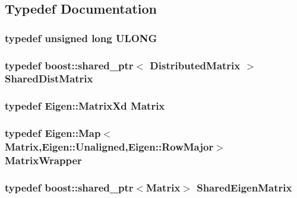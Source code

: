 \subsection{Typedef Documentation}
\hypertarget{namespaceJKBuilder_af632da489ebc3708ec3ab6791ee53fa4}{
\subsubsection[{ULONG}]{\setlength{\rightskip}{0pt plus 5cm}typedef unsigned long {\bf ULONG}}}
\label{namespaceJKBuilder_af632da489ebc3708ec3ab6791ee53fa4}
\hypertarget{namespaceJKBuilder_a3b337e72f5cb0686ec93e063dda09c70}{
\subsubsection[{SharedDistMatrix}]{\setlength{\rightskip}{0pt plus 5cm}typedef boost::shared\_\-ptr$<$ {\bf DistributedMatrix} $>$ {\bf SharedDistMatrix}}}
\label{namespaceJKBuilder_a3b337e72f5cb0686ec93e063dda09c70}
\hypertarget{namespaceJKBuilder_adfecb398197e2c871cba88a5f9f3c5fe}{
\subsubsection[{Matrix}]{\setlength{\rightskip}{0pt plus 5cm}typedef Eigen::MatrixXd {\bf Matrix}}}
\label{namespaceJKBuilder_adfecb398197e2c871cba88a5f9f3c5fe}
\hypertarget{namespaceJKBuilder_a3f2825245708c24ccca9ddcadca9754d}{
\subsubsection[{MatrixWrapper}]{\setlength{\rightskip}{0pt plus 5cm}typedef Eigen::Map$<${\bf Matrix},Eigen::Unaligned,Eigen::RowMajor$>$ {\bf MatrixWrapper}}}
\label{namespaceJKBuilder_a3f2825245708c24ccca9ddcadca9754d}
\hypertarget{namespaceJKBuilder_a36fdf7f9a8c81e7ddac62fddb1996ab3}{
\subsubsection[{SharedEigenMatrix}]{\setlength{\rightskip}{0pt plus 5cm}typedef boost::shared\_\-ptr$<${\bf Matrix}$>$ {\bf SharedEigenMatrix}}}
